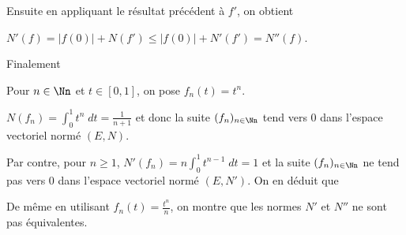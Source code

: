 {{Ensuite en appliquant le résultat précédent à $f'$,  on obtient 

\begin{center}
$N'(f)=|f(0)|+N(f')\leqslant|f(0)|+N'(f')=N''(f)$.
\end{center}

Finalement 

\begin{center}
\end{center}

Pour $n\in\Nn$ et $t\in[0,1]$, on pose $f_n(t) = t^n$. 

$N(f_n)=\int_{0}^{1}t^n\;dt= \frac{1}{n+1}$ et donc la suite $(f_n)_{n\in\Nn}$ tend vers $0$ dans l'espace vectoriel normé $(E,N)$.

Par contre, pour $n\geqslant1$, $N'(f_n)=n\int_{0}^{1}t^{n-1}\;dt=1$ et la suite $(f_n)_{n\in\Nn}$  ne tend pas vers $0$ dans l'espace vectoriel normé $(E,N')$. On en déduit que

\begin{center}
\end{center}

De même en utilisant $f_n(t)= \frac{t^n}{n}$, on montre que les normes $N'$ et $N''$ ne sont pas équivalentes.
}
}
